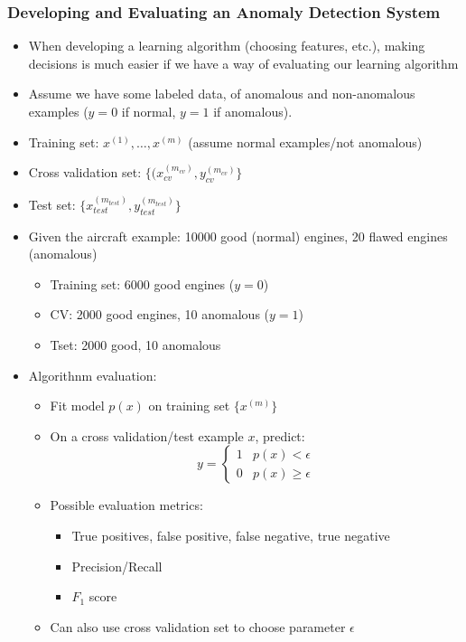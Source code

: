 \subsubsection{Developing and Evaluating an Anomaly Detection System}
\begin{itemize}[--]
	\item When developing a learning algorithm (choosing features, etc.), making decisions is much easier if we have a way of evaluating our learning algorithm
	\item Assume we have some labeled data, of anomalous and non-anomalous examples ($y=0$ if normal, $y=1$ if anomalous).
	\item Training set: $x^{(1)},\ldots, x^{(m)}$ (assume normal examples/not anomalous)
	\item Cross validation set: $\{ (x_{cv}^{(m_{cv})}, y_{cv}^{(m_{cv})}\}$
	\item Test set: $\{ x_{test}^{(m_{test})}, y_{test}^{(m_{test})}\}$
	\item Given the aircraft example: 10000 good (normal) engines, 20 flawed engines (anomalous)
	\begin{itemize}[--]
		\item Training set: 6000 good engines ($y=0$)
		\item CV: 2000 good engines, 10 anomalous ($y=1$)
		\item Tset: 2000 good, 10 anomalous
	\end{itemize}

	\item Algorithnm evaluation:
	\begin{itemize}[--]
		\item Fit model $p(x)$ on training set $\{ x^{(m)}\}$
		\item On a cross validation/test example $x$, predict:
			$$y=\begin{cases}
				1 & p(x)< \epsilon \\
				0 & p(x) \geq\epsilon
			\end{cases}$$
		\item Possible evaluation metrics:
		\begin{itemize}[--]
			\item True positives, false positive, false negative, true negative
			\item Precision/Recall
			\item $F_1$ score
		\end{itemize}
		\item Can also use cross validation set to choose parameter $\epsilon$
	\end{itemize}
\end{itemize}

